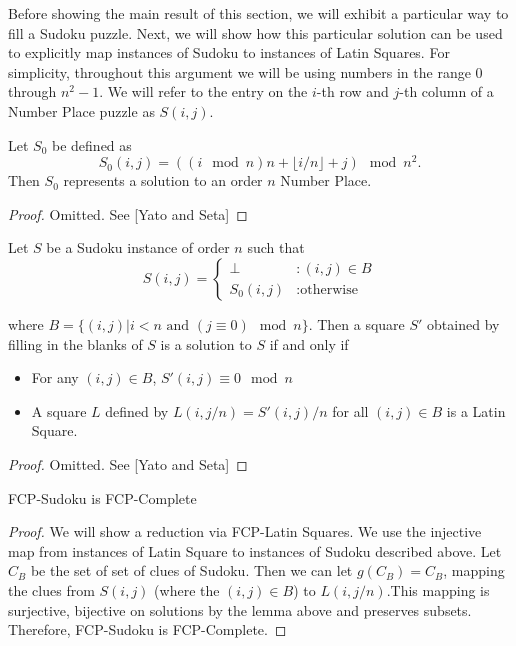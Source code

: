 \documentclass[runningheads,a4paper]{llncs}
\begin{document}
Before showing the main result of this section, we will exhibit a particular way to fill a Sudoku puzzle. Next, we will show how this particular solution can be used to explicitly map instances of Sudoku to instances of Latin Squares. For simplicity, throughout this argument we will be using numbers in the range $0$ through $n^2 - 1$. We will refer to the entry on the $i$-th row and $j$-th column of a Number Place puzzle as $S(i,j)$.

\begin{proposition}
Let $S_0$ be defined as
$$S_0 (i,j) = ((i \mod n) n + \lfloor i/n \rfloor + j) \mod n^2. $$
Then $S_0$ represents a solution to an order $n$ Number Place.
\end{proposition}

\begin{proof} 
Omitted. See [Yato and Seta] 
\end{proof}

\begin{lemma}
Let $S$ be a Sudoku instance of order $n$ such that
\begin{displaymath}
S(i,j) = \left\{
\begin{array}{lr}
\perp & : (i,j) \in B\\
S_0 (i,j) & : \text{otherwise}
\end{array}
\right.
\end{displaymath}

where $B = \{ (i,j) | i < n \text{ and } (j \equiv 0) \mod n \}$. Then a square $S'$ obtained by filling in the blanks of $S$ is a solution to $S$ if and only if

\begin{itemize}
\item For any $(i,j) \in B$, $S'(i,j) \equiv 0 \mod n$
\item A square $L$ defined by $L(i, j/n) = S'(i,j)/n$ for all $(i, j) \in B$ is a Latin Square.
\end{itemize}

\end{lemma}

\begin{proof} 
Omitted. See [Yato and Seta] 
\end{proof}

\begin{lemma} 
FCP-Sudoku is FCP-Complete
\end{lemma}

\begin{proof} 
We will show a reduction via FCP-Latin Squares. We use the injective map from instances of Latin Square to instances of Sudoku described above. Let $C_B$ be the set of set of clues of Sudoku. Then we can let $g(C_B)=C_B$, mapping the clues from $S(i,j)$ (where the $(i,j) \in B$) to $L(i, j/n)$.This mapping is surjective, bijective on solutions by the lemma above and preserves subsets. Therefore, FCP-Sudoku is FCP-Complete. 
\end{proof}
\end{document}
